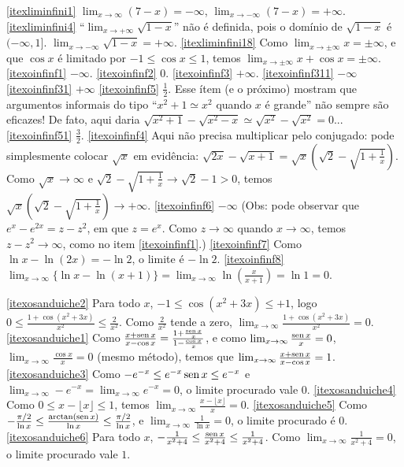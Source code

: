 \begin{Solution}{4.9}
\eqref{itexliminfini1} $\lim_{x\to\infty}(7-x)=-\infty$,
$\lim_{x\to-\infty}(7-x)=+\infty$.
\eqref{itexliminfini4} ``$\lim_{x\to +\infty}\sqrt{1-x}$'' não é
definida, pois o domínio de $\sqrt{1-x}$ é $(-\infty,1]$.
$\lim_{x\to -\infty}\sqrt{1-x}=+\infty$.
\eqref{itexliminfini18} Como $\lim_{x\to\pm\infty}
x=\pm\infty$, e que $\cos x$ é limitado por $-1\leq \cos x\leq 1$,
temos $\lim_{x\to \pm\infty}x+\cos x=\pm\infty$.
\eqref{itexoinfinf1} $-\infty$.
\eqref{itexoinfinf2} $0$.
\eqref{itexoinfinf3} $+\infty$.
\eqref{itexoinfinf311} $-\infty$
\eqref{itexoinfinf31} $+\infty$
\eqref{itexoinfinf5} $\frac12$.
Esse ítem (e o próximo) mostram que argumentos informais do tipo
``$x^2+1\simeq x^2$
quando $x$ é grande'' não sempre são eficazes! De fato, aqui daria
$\sqrt{x^2+1}-\sqrt{x^2-x}\simeq \sqrt{x^2}-\sqrt{x^2}=0$...
\eqref{itexoinfinf51} $\frac32$.
\eqref{itexoinfinf4} Aqui não precisa multiplicar pelo conjugado: pode
simplesmente colocar $\sqrt{x}$ em evidência:
$\sqrt{2x}-\sqrt{x+1}=\sqrt{x}(\sqrt{2}-\sqrt{1+\frac1x})$. Como
$\sqrt{x}\to\infty$ e $\sqrt{2}-\sqrt{1+\frac1x}\to \sqrt{2}-1>0$,
temos $\sqrt{x}(\sqrt{2}-\sqrt{1+\frac1x})\to +\infty$.
\eqref{itexoinfinf6} $-\infty$ (Obs: pode observar que $e^x-e^{2x}=z-z^2$, em que $z=e^x$. Como $z\to \infty$
quando $x\to\infty$, temos $z-z^2\to \infty$, como no item \eqref{itexoinfinf1}.)
\eqref{itexoinfinf7} Como $\ln x-\ln(2x)=-\ln 2$, o limite é $-\ln 2$.
\eqref{itexoinfinf8} $\lim_{x\to \infty}\{\ln x-\ln(x+1)\}=
\lim_{x\to \infty}\ln (\frac{x}{x+1})=\ln 1=0$.
\end{Solution}
\begin{Solution}{4.10}
\eqref{itexosanduiche2} Para todo $x$, $-1\leq
\cos(x^2+3x)\leq +1$, logo
$0\leq \frac{1+\cos(x^2+3x)}{x^2}\leq \frac{2}{x^2}$.
Como $\frac{2}{x^2}$ tende a zero,
$\lim_{x\to\infty}\frac{1+\cos(x^2+3x)}{x^2}=0$.
\eqref{itexosanduiche1} Como $\frac{x+\operatorname{sen} x}{x-\cos
x}=\frac{1+\frac{\operatorname{sen} x}{x}}{1-\frac{\cos x}{x}}$, e como
$\lim_{x\to\infty}\frac{\operatorname{sen} x}{x}=0$, $\lim_{x\to\infty}\frac{\cos
x}{x}=0$ (mesmo método), temos que $\lim_{x\to\infty}\frac{x+\operatorname{sen}
x}{x-\cos x}=1$.
\eqref{itexosanduiche3}
Como $-e^{-x}\leq e^{-x}\operatorname{sen} x\leq e^{-x}$ e
$\lim_{x\to\infty}-e^{-x}=\lim_{x\to\infty}e^{-x}=0$, o limite
procurado vale $0$.
\eqref{itexosanduiche4} Como $0\leq x-\lfloor x\rfloor\leq 1$, temos
$\lim_{x\to\infty}\frac{x-\lfloor x\rfloor}{x}=0$.
\eqref{itexosanduiche5} Como
$-\frac{\pi/2}{\ln x}\leq \frac{\arctan(\operatorname{sen} x)}{\ln x}\leq
\frac{\pi/2}{\ln x}$, e $\lim_{x\to\infty}\frac{1}{\ln x}=0$, o
limite procurado é $0$.
\eqref{itexosanduiche6} Para todo $x$,
$-\frac{1}{x^2+4}\leq \frac{\operatorname{sen} x}{x^2+4}\leq
\frac{1}{x^2+4}$. Como
$\lim_{x\to \infty}\frac{1}{x^2+4}=0$, o limite procurado vale
$1$.
\end{Solution}
